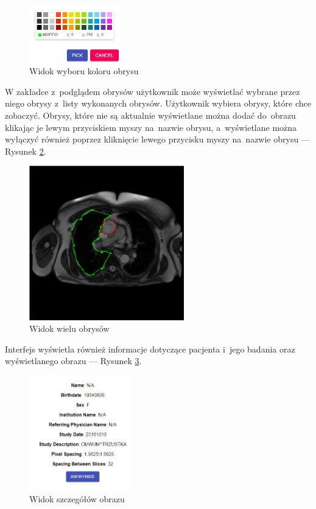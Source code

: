 \documentclass[a4paper,11pt,twoside,openright]{report}
\theoremstyle{definition}
\begin{document}
\begin{figure}[h!]
	\center
	\includegraphics[width=0.35\textwidth]{16}
	\caption{Widok wyboru koloru obrysu}
    	\label{fig:16}
\end{figure}

W zakładce z~podglądem obrysów użytkownik może wyświetlać wybrane przez niego
obrysy z~listy wykonanych obrysów. Użytkownik wybiera obrysy, które chce zobaczyć.
Obrysy, które nie są aktualnie wyświetlane można dodać do~obrazu klikając je
lewym przyciskiem myszy na~nazwie obrysu, a~wyświetlane można wyłączyć również
poprzez kliknięcie lewego przycisku myszy na~nazwie obrysu --- Rysunek \ref{fig:17}.

\begin{figure}[h!]
	\center
	\includegraphics[width=0.6\textwidth]{17}
	\caption{Widok wielu obrysów}
    	\label{fig:17}
\end{figure}

\pagebreak

Interfejs wyświetla również informacje dotyczące pacjenta i~jego badania oraz
wyświetlanego obrazu --- Rysunek \ref{fig:18}.

\begin{figure}[h!]
	\center
	\includegraphics[width=0.4\textwidth]{18}
	\caption{Widok szczegółów obrazu}
    	\label{fig:18}
\end{figure}
\end{document}
